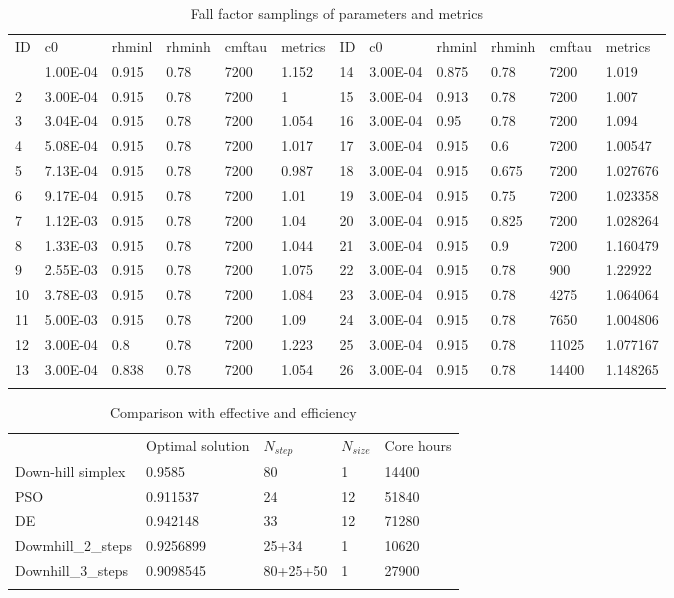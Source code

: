 \documentclass[gmd, manuscript]{copernicus}
\begin{document}
\begin{table}[t]
\caption{Fall factor samplings of parameters and metrics}
\begin{tabular}{l l l l l l l l l l l l}
\tophline
ID & c0 & rhminl & rhminh & cmftau & metrics & ID & c0 & rhminl & rhminh & cmftau & metrics \\
\middlehline
1  & 1.00E-04 & 0.915 & 0.78 & 7200 & 1.152 & 14 & 3.00E-04  & 0.875 & 0.78  & 7200  & 1.019     \\
2  & 3.00E-04 & 0.915 & 0.78 & 7200 & 1     & 15 & 3.00E-04  & 0.913 & 0.78  & 7200  & 1.007     \\
3  & 3.04E-04 & 0.915 & 0.78 & 7200 & 1.054 & 16 & 3.00E-04  & 0.95  & 0.78  & 7200  & 1.094     \\
4  & 5.08E-04 & 0.915 & 0.78 & 7200 & 1.017 & 17 & 3.00E-04  & 0.915 & 0.6   & 7200  & 1.00547   \\
5  & 7.13E-04 & 0.915 & 0.78 & 7200 & 0.987 & 18 & 3.00E-04  & 0.915 & 0.675 & 7200  & 1.027676  \\
6  & 9.17E-04 & 0.915 & 0.78 & 7200 & 1.01  & 19 & 3.00E-04  & 0.915 & 0.75  & 7200  & 1.023358  \\
7  & 1.12E-03 & 0.915 & 0.78 & 7200 & 1.04  & 20 & 3.00E-04  & 0.915 & 0.825 & 7200  & 1.028264  \\
8  & 1.33E-03 & 0.915 & 0.78 & 7200 & 1.044 & 21 & 3.00E-04  & 0.915 & 0.9   & 7200  & 1.160479  \\
9  & 2.55E-03 & 0.915 & 0.78 & 7200 & 1.075 & 22 & 3.00E-04  & 0.915 & 0.78  & 900   & 1.22922   \\
10 & 3.78E-03 & 0.915 & 0.78 & 7200 & 1.084 & 23 & 3.00E-04  & 0.915 & 0.78  & 4275  & 1.064064  \\
11 & 5.00E-03 & 0.915 & 0.78 & 7200 & 1.09  & 24 & 3.00E-04  & 0.915 & 0.78  & 7650  & 1.004806  \\
12 & 3.00E-04 & 0.8   & 0.78 & 7200 & 1.223 & 25 & 3.00E-04  & 0.915 & 0.78  & 11025 & 1.077167  \\
13 & 3.00E-04 & 0.838 & 0.78 & 7200 & 1.054 & 26 & 3.00E-04  & 0.915 & 0.78  & 14400 & 1.148265  \\
\bottomhline
\end{tabular}
\belowtable{} %
\end{table}

\begin{table}[t]
\caption{Comparison with effective and efficiency}
\begin{tabular}{l l l l l}
\tophline
  & Optimal solution & $N_{step}$ & $N_{size}$ & Core hours \\
\middlehline
Down-hill simplex & 0.9585    & 80         & 1  & 14400 \\
PSO               & 0.911537  & 24         & 12 & 51840 \\
DE                & 0.942148  & 33         & 12 & 71280 \\
Dowmhill\_2\_steps  & 0.9256899 & 25+34    &  1 & 10620 \\
Downhill\_3\_steps  & 0.9098545 & 80+25+50 &  1 & 27900 \\
\bottomhline
\end{tabular}
\belowtable{} %
\end{table}
\end{document}
